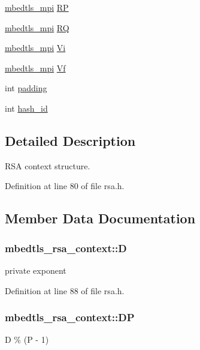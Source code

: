 \begin{DoxyCompactItemize}
\item 
\hyperlink{structmbedtls__mpi}{mbedtls\-\_\-mpi} \hyperlink{structmbedtls__rsa__context_a97215f3f5482cfb4887d00d47f030610}{R\-P}
\item 
\hyperlink{structmbedtls__mpi}{mbedtls\-\_\-mpi} \hyperlink{structmbedtls__rsa__context_a495e2de1f324a00ba83fe1aa72652a06}{R\-Q}
\item 
\hyperlink{structmbedtls__mpi}{mbedtls\-\_\-mpi} \hyperlink{structmbedtls__rsa__context_ae042ea2b11c2934694dbacb3656331ca}{Vi}
\item 
\hyperlink{structmbedtls__mpi}{mbedtls\-\_\-mpi} \hyperlink{structmbedtls__rsa__context_a5537a6306b03dbd02ba435738d660333}{Vf}
\item 
int \hyperlink{structmbedtls__rsa__context_ac78a4848175e4921f6beb677f4a49496}{padding}
\item 
int \hyperlink{structmbedtls__rsa__context_ab220b6999b79d75f2186b2ac67f5267c}{hash\-\_\-id}
\end{DoxyCompactItemize}


\subsection{Detailed Description}
R\-S\-A context structure. 

Definition at line 80 of file rsa.\-h.



\subsection{Member Data Documentation}
\hypertarget{structmbedtls__rsa__context_ad9552371239922dd67d146b937d1aada}{
\subsubsection[{D}]{ mbedtls\-\_\-rsa\-\_\-context\-::\-D}}\label{structmbedtls__rsa__context_ad9552371239922dd67d146b937d1aada}
private exponent 

Definition at line 88 of file rsa.\-h.

\hypertarget{structmbedtls__rsa__context_aa46b066a4cf04deb4e627e69e6b036e8}{
\subsubsection[{D\-P}]{ mbedtls\-\_\-rsa\-\_\-context\-::\-D\-P}}\label{structmbedtls__rsa__context_aa46b066a4cf04deb4e627e69e6b036e8}
D \% (P -\/ 1) 


